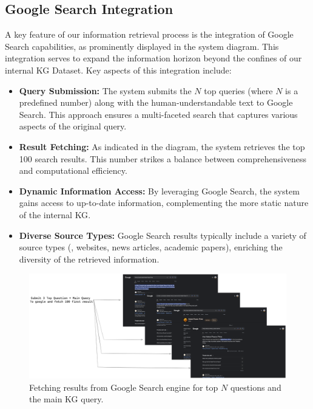 \subsection{Google Search Integration}\label{subsec:google-search-integration}
A key feature of our information retrieval process is the integration of Google Search capabilities, as prominently displayed in the system diagram.
This integration serves to expand the information horizon beyond the confines of our internal \ac{KG} Dataset.
Key aspects of this integration include:

\begin{itemize}
    \item \textbf{Query Submission:} The system submits the $N$ top queries (where $N$ is a predefined number) along with the human-understandable text to Google Search. This approach ensures a multi-faceted search that captures various aspects of the original query.
    \item \textbf{Result Fetching:} As indicated in the diagram, the system retrieves the top 100 search results. This number strikes a balance between comprehensiveness and computational efficiency.
    \item \textbf{Dynamic Information Access:} By leveraging Google Search, the system gains access to up-to-date information, complementing the more static nature of the internal \ac{KG}.
    \item \textbf{Diverse Source Types:} Google Search results typically include a variety of source types (\eg, websites, news articles, academic papers), enriching the diversity of the retrieved information.
\end{itemize}

\begin{figure}[ht!]
    \centering
    \begin{minipage}[b]{\textwidth}
        \centering
        \includegraphics[width=\textwidth]{res/Google-Search-Result}
    \end{minipage}
    \caption{Fetching results from Google Search engine for top $N$ questions and the main \ac{KG} query.}
    \label{fig:google-search-result}
\end{figure}

